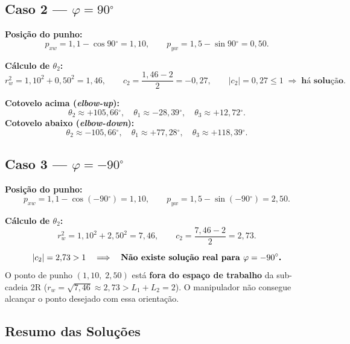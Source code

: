 \documentclass[12pt,a4paper]{article}
\newcommand{\degr}{\ensuremath{^{\circ}}}
\begin{document}
\subsection{Caso 2 --- $\varphi = 90\degr$}

\textbf{Posi\c{c}\~ao do punho:}
\[
  p_{xw} = 1{,}1 - \cos 90\degr = 1{,}10, \qquad p_{yw} = 1{,}5 - \sin 90\degr = 0{,}50.
\]

\textbf{C\'alculo de $\theta_2$:}
\[
  r_w^2 = 1{,}10^2 + 0{,}50^2 = 1{,}46, \qquad
  c_2 = \frac{1{,}46 - 2}{2} = -0{,}27,
  \qquad |c_2|=0{,}27 \leq 1 \;\Rightarrow\; \textbf{h\'a solu\c{c}\~ao}.
\]

\begin{tcolorbox}[resultbox, title={Solu\c{c}\~oes para $\varphi = 90^{\circ}$}]
\textbf{Cotovelo acima (\textit{elbow-up}):}
\[
  \theta_2 \approx +105{,}66\degr, \quad
  \theta_1 \approx -28{,}39\degr, \quad
  \theta_3 \approx +12{,}72\degr.
\]
\textbf{Cotovelo abaixo (\textit{elbow-down}):}
\[
  \theta_2 \approx -105{,}66\degr, \quad
  \theta_1 \approx +77{,}28\degr, \quad
  \theta_3 \approx +118{,}39\degr.
\]
\end{tcolorbox}

\subsection{Caso 3 --- $\varphi = -90\degr$}

\textbf{Posi\c{c}\~ao do punho:}
\[
  p_{xw} = 1{,}1 - \cos(-90\degr) = 1{,}10, \qquad p_{yw} = 1{,}5 - \sin(-90\degr) = 2{,}50.
\]

\textbf{C\'alculo de $\theta_2$:}
\[
  r_w^2 = 1{,}10^2 + 2{,}50^2 = 7{,}46, \qquad
  c_2 = \frac{7{,}46 - 2}{2} = 2{,}73.
\]

\begin{tcolorbox}[warnbox]
\[
  |c_2| = 2{,}73 > 1 \quad \Longrightarrow \quad
  \text{\textbf{N\~ao existe solu\c{c}\~ao real para $\varphi = -90\degr$.}}
\]
O ponto de punho $(1{,}10,\;2{,}50)$ est\'a \textbf{fora do espa\c{c}o de trabalho}
da sub-cadeia 2R ($r_w = \sqrt{7{,}46} \approx 2{,}73 > L_1+L_2 = 2$).
O manipulador n\~ao consegue alcan\c{c}ar o ponto desejado com essa orienta\c{c}\~ao.
\end{tcolorbox}

\subsection{Resumo das Solu\c{c}\~oes}
\end{document}
